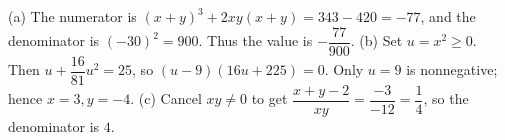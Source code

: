 (a) The numerator is $(x+y)^3+2xy(x+y)=343-420=-77$, and the denominator is $(-30)^2=900$. Thus the value is $\boxed{-\dfrac{77}{900}}$.
(b) Set $u=x^2\ge0$. Then $u+\dfrac{16}{81}u^2=25$, so $(u-9)(16u+225)=0$. Only $u=9$ is nonnegative; hence $\boxed{x=3,y=-4}$.
(c) Cancel $xy\ne0$ to get $\dfrac{x+y-2}{xy}=\dfrac{-3}{-12}=\dfrac{1}{4}$, so the denominator is $\boxed4$.
